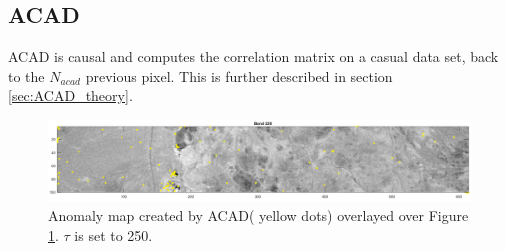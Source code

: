 \subsection{ACAD}

ACAD is causal and computes the correlation matrix on a casual data set, back to the $N_{acad}$ previous pixel. This is further described in section \ref{sec:ACAD_theory}.

\begin{figure}[H]
\centering                                                           

   \includegraphics[scale=0.3]{images/AD_testing/anomaly_map_over_picture_tresh=250.png}
  \caption{Anomaly map created by ACAD( yellow dots) overlayed over Figure \ref{fig:cuprite_scene_band_220}. $\tau$ is set to 250.} 
  \label{fig:cuprite_scene_band_220}
\end{figure}
 